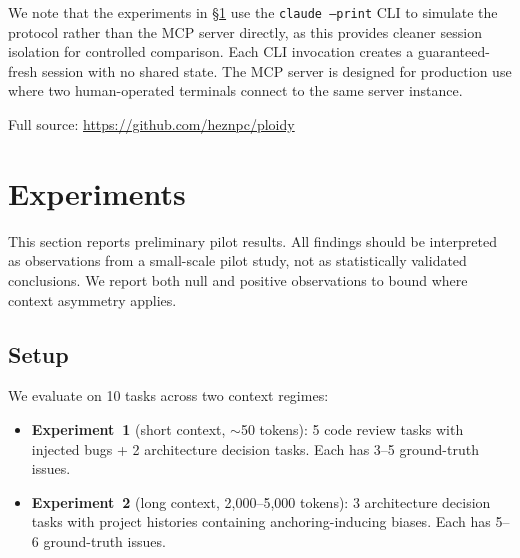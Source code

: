 \documentclass[11pt]{article}
\begin{document}
We note that the experiments in \S\ref{sec:experiments} use the \texttt{claude --print} CLI to simulate the protocol rather than the MCP server directly, as this provides cleaner session isolation for controlled comparison. Each CLI invocation creates a guaranteed-fresh session with no shared state. The MCP server is designed for production use where two human-operated terminals connect to the same server instance.

Full source: \url{https://github.com/heznpc/ploidy}

\section{Experiments}
\label{sec:experiments}

This section reports preliminary pilot results. All findings should be interpreted as observations from a small-scale pilot study, not as statistically validated conclusions. We report both null and positive observations to bound where context asymmetry applies.

\subsection{Setup}
\label{sec:setup}

We evaluate on 10 tasks across two context regimes:
\begin{itemize}[leftmargin=1.5em]
  \item \textbf{Experiment~1} (short context, $\sim$50 tokens): 5 code review tasks with injected bugs + 2 architecture decision tasks. Each has 3--5 ground-truth issues.
  \item \textbf{Experiment~2} (long context, 2,000--5,000 tokens): 3 architecture decision tasks with project histories containing anchoring-inducing biases. Each has 5--6 ground-truth issues.
\end{itemize}
\end{document}
